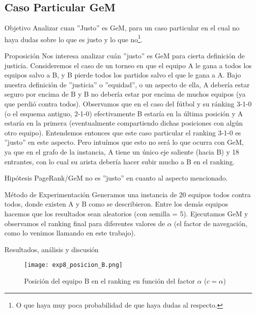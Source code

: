 \subsection{Caso Particular GeM}
\label{subsec:exp8}
\begin{LaTeXdescription}
    \item[Objetivo] Analizar cuan ''Justo'' es GeM, para un caso particular en
        el cual no haya dudas sobre lo que es justo y lo que no\footnote{O que
        haya muy poca probabilidad de que haya dudas al respecto.}.\\

    \item[Proposici\'on] Nos interesa analizar cu\'an ''justo'' es GeM para
        cierta definici\'on de justicia. Consideremos el caso de un torneo en
        que el equipo A le gana a todos los equipos salvo a B, y B pierde todos
        los partidos salvo el que le gana a A. Bajo nuestra definición de
        ''justicia'' o ''equidad'', o un aspecto de ella, A deber\'ia estar
        seguro por encima de B y B no deber\'ia estar por encima de muchos
        equipos (ya que perdi\'o contra todos). Observamos que en el caso del
        f\'utbol y su ránking 3-1-0 (o el esquema antiguo, 2-1-0) efectivamente
        B estar\'ia en la \'ultima posici\'on y A estar\'ia en la primera
        (eventualmente compartiendo dichas posiciones con alg\'un otro equipo).
        Entendemos entonces que este caso particular el ranking 3-1-0 es
        ''justo'' en este aspecto. Pero intu\'imos que esto no ser\'a lo que
        ocurra con GeM, ya que en el grafo de la instancia, A tiene un \'unico
        eje saliente (hacia B) y 18 entrantes, con lo cual su arista deber\'ia
        hacer subir mucho a B en el ranking.\\

    \item[Hip\'otesis] PageRank/GeM no es ''justo'' en cuanto al aspecto
        mencionado.\\

    \item[M\'etodo de Experimentaci\'on] Generamos una instancia de 20 equipos
        todos contra todos, donde existen A y B como se describieron. Entre los
        dem\'as equipos hacemos que los resultados sean aleatorios (con semilla =
        5). Ejecutamos GeM y observamos el ranking final para diferentes valores
        de $\alpha$ (el factor de navegaci\'on, como lo venimos llamando en este
        trabajo).\\

    \item[Resultados, an\'alisis y discusi\'on]
        
\end{LaTeXdescription}

\begin{wrapfigure}{l}{0.5\textwidth}
    \texttt{[image: exp8\_posicion\_B.png]}
    \caption{Posici\'on del equipo B en el ranking en funci\'on del factor
        $\alpha$ ($c=\alpha$)}
    \label{fig:exp8_posB}
\end{wrapfigure}
\noindent
